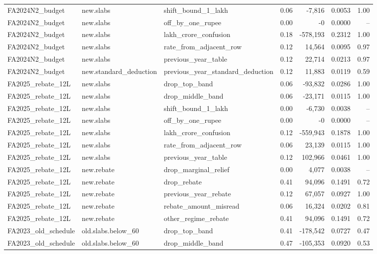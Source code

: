 \begin{table}[t]
\begin{tabular}{lllrrrr}
FA2024N2\_budget & new.slabs & shift\_bound\_1\_lakh & 0.06 & -7,816 & 0.0053 & 1.00 \\
FA2024N2\_budget & new.slabs & off\_by\_one\_rupee & 0.00 & -0 & 0.0000 & -- \\
FA2024N2\_budget & new.slabs & lakh\_crore\_confusion & 0.18 & -578,193 & 0.2312 & 1.00 \\
FA2024N2\_budget & new.slabs & rate\_from\_adjacent\_row & 0.12 & 14,564 & 0.0095 & 0.97 \\
FA2024N2\_budget & new.slabs & previous\_year\_table & 0.12 & 22,714 & 0.0213 & 0.97 \\
FA2024N2\_budget & new.standard\_deduction & previous\_year\_standard\_deduction & 0.12 & 11,883 & 0.0119 & 0.59 \\
FA2025\_rebate\_12L & new.slabs & drop\_top\_band & 0.06 & -93,832 & 0.0286 & 1.00 \\
FA2025\_rebate\_12L & new.slabs & drop\_middle\_band & 0.06 & -23,171 & 0.0115 & 1.00 \\
FA2025\_rebate\_12L & new.slabs & shift\_bound\_1\_lakh & 0.00 & -6,730 & 0.0038 & -- \\
FA2025\_rebate\_12L & new.slabs & off\_by\_one\_rupee & 0.00 & -0 & 0.0000 & -- \\
FA2025\_rebate\_12L & new.slabs & lakh\_crore\_confusion & 0.12 & -559,943 & 0.1878 & 1.00 \\
FA2025\_rebate\_12L & new.slabs & rate\_from\_adjacent\_row & 0.06 & 23,139 & 0.0115 & 1.00 \\
FA2025\_rebate\_12L & new.slabs & previous\_year\_table & 0.12 & 102,966 & 0.0461 & 1.00 \\
FA2025\_rebate\_12L & new.rebate & drop\_marginal\_relief & 0.00 & 4,077 & 0.0038 & -- \\
FA2025\_rebate\_12L & new.rebate & drop\_rebate & 0.41 & 94,096 & 0.1491 & 0.72 \\
FA2025\_rebate\_12L & new.rebate & previous\_year\_rebate & 0.12 & 67,057 & 0.0927 & 1.00 \\
FA2025\_rebate\_12L & new.rebate & rebate\_amount\_misread & 0.06 & 16,324 & 0.0202 & 0.81 \\
FA2025\_rebate\_12L & new.rebate & other\_regime\_rebate & 0.41 & 94,096 & 0.1491 & 0.72 \\
FA2023\_old\_schedule & old.slabs.below\_60 & drop\_top\_band & 0.41 & -178,542 & 0.0727 & 0.47 \\
FA2023\_old\_schedule & old.slabs.below\_60 & drop\_middle\_band & 0.47 & -105,353 & 0.0920 & 0.53 \\

\end{tabular}
\end{table}
